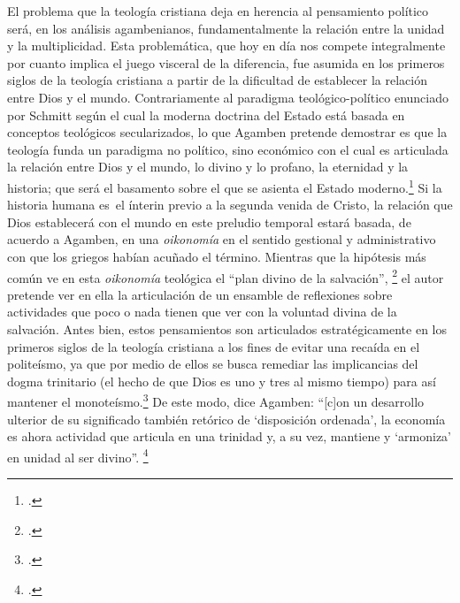 El problema que la teología cristiana deja en herencia al pensamiento político será, en los análisis agambenianos, fundamentalmente la relación entre la unidad y la multiplicidad. Esta problemática, que hoy en día nos compete integralmente por cuanto implica el juego visceral de la diferencia, fue asumida en los primeros siglos de la teología cristiana a partir de la dificultad de establecer la relación entre Dios y el mundo. Contrariamente al paradigma teológico-político enunciado por Schmitt según el cual la moderna doctrina del Estado está basada en conceptos teológicos secularizados, lo que Agamben pretende demostrar es que la teología funda un paradigma no político, sino económico con el cual es articulada la relación entre Dios y el mundo, lo divino y lo profano, la eternidad y la historia; que será el basamento sobre el que se asienta el Estado moderno.\footcite[16]{@7102-AGAMBEN2008} Si la historia humana es~el ínterin previo a la segunda venida de Cristo, la relación que Dios establecerá con el mundo en este preludio temporal estará basada, de acuerdo a Agamben, en una \emph{oikonomía} en el sentido gestional y administrativo con que los griegos habían acuñado el término. Mientras que la hipótesis más común ve en esta \emph{oikonomía} teológica el \enquote{plan divino de la salvación}, \footcite[46]{@7102-AGAMBEN2008} el autor pretende ver en ella la articulación de un ensamble de reflexiones sobre actividades que poco o nada tienen que ver con la voluntad divina de la salvación. Antes bien, estos pensamientos son articulados estratégicamente en los primeros siglos de la teología cristiana a los fines de evitar una recaída en el politeísmo, ya que por medio de ellos se busca remediar las implicancias del dogma trinitario (el hecho de que Dios es uno y tres al mismo tiempo) para así mantener el monoteísmo.\footcite[71-72]{@7102-AGAMBEN2008} De este modo, dice Agamben: \enquote{{[}c{]}on un desarrollo ulterior de su significado también retórico de \enquote{disposición ordenada}, la economía es ahora actividad  que articula en una trinidad y, a su vez, mantiene y \enquote{armoniza} en unidad al ser divino}. \footcite[77]{@7102-AGAMBEN2008}

